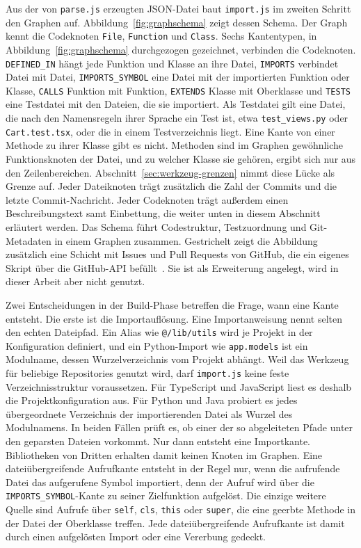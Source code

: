 Aus der von \texttt{parse.js} erzeugten JSON-Datei baut \texttt{import.js} im zweiten Schritt den Graphen auf. Abbildung~\ref{fig:graphschema} zeigt dessen Schema. Der Graph kennt die Codeknoten \texttt{File}, \texttt{Function} und \texttt{Class}. Sechs Kantentypen, in Abbildung~\ref{fig:graphschema} durchgezogen gezeichnet, verbinden die Codeknoten. \texttt{DEFINED\_IN} hängt jede Funktion und Klasse an ihre Datei, \texttt{IMPORTS} verbindet Datei mit Datei, \texttt{IMPORTS\_SYMBOL} eine Datei mit der importierten Funktion oder Klasse, \texttt{CALLS} Funktion mit Funktion, \texttt{EXTENDS} Klasse mit Oberklasse und \texttt{TESTS} eine Testdatei mit den Dateien, die sie importiert. Als Testdatei gilt eine Datei, die nach den Namensregeln ihrer Sprache ein Test ist, etwa \texttt{test\_views.py} oder \texttt{Cart.test.tsx}, oder die in einem Testverzeichnis liegt. Eine Kante von einer Methode zu ihrer Klasse gibt es nicht. Methoden sind im Graphen gewöhnliche Funktionsknoten der Datei, und zu welcher Klasse sie gehören, ergibt sich nur aus den Zeilenbereichen. Abschnitt~\ref{sec:werkzeug-grenzen} nimmt diese Lücke als Grenze auf. Jeder Dateiknoten trägt zusätzlich die Zahl der Commits und die letzte Commit-Nachricht. Jeder Codeknoten trägt außerdem einen Beschreibungstext samt Einbettung, die weiter unten in diesem Abschnitt erläutert werden. Das Schema führt Codestruktur, Testzuordnung und Git-Metadaten in einem Graphen zusammen. Gestrichelt zeigt die Abbildung zusätzlich eine Schicht mit Issues und Pull Requests von GitHub, die ein eigenes Skript über die GitHub-API befüllt~\parencite{githubrest}. Sie ist als Erweiterung angelegt, wird in dieser Arbeit aber nicht genutzt.

Zwei Entscheidungen in der Build-Phase betreffen die Frage, wann eine Kante entsteht. Die erste ist die Importauflösung. Eine Importanweisung nennt selten den echten Dateipfad. Ein Alias wie \texttt{@/lib/utils} wird je Projekt in der Konfiguration definiert, und ein Python-Import wie \texttt{app.models} ist ein Modulname, dessen Wurzelverzeichnis vom Projekt abhängt. Weil das Werkzeug für beliebige Repositories genutzt wird, darf \texttt{import.js} keine feste Verzeichnisstruktur voraussetzen. Für TypeScript und JavaScript liest es deshalb die Projektkonfiguration aus. Für Python und Java probiert es jedes übergeordnete Verzeichnis der importierenden Datei als Wurzel des Modulnamens. In beiden Fällen prüft es, ob einer der so abgeleiteten Pfade unter den geparsten Dateien vorkommt. Nur dann entsteht eine Importkante. Bibliotheken von Dritten erhalten damit keinen Knoten im Graphen. Eine dateiübergreifende Aufrufkante entsteht in der Regel nur, wenn die aufrufende Datei das aufgerufene Symbol importiert, denn der Aufruf wird über die \texttt{IMPORTS\_SYMBOL}-Kante zu seiner Zielfunktion aufgelöst. Die einzige weitere Quelle sind Aufrufe über \texttt{self}, \texttt{cls}, \texttt{this} oder \texttt{super}, die eine geerbte Methode in der Datei der Oberklasse treffen. Jede dateiübergreifende Aufrufkante ist damit durch einen aufgelösten Import oder eine Vererbung gedeckt.

